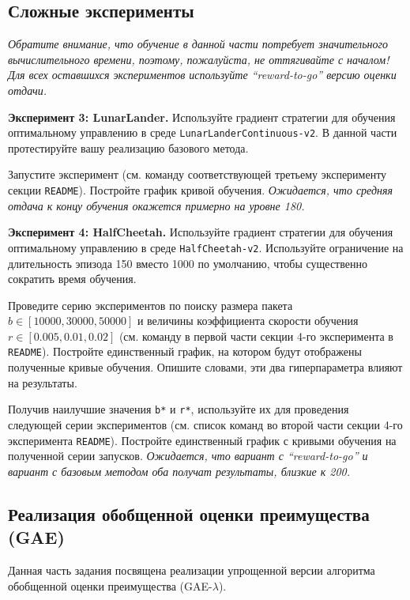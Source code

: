 \documentclass[12pt, oneside]{article}
\begin{document}
\subsection{Сложные эксперименты}

\textit{Обратите внимание, что обучение в данной части потребует значительного вычислительного времени, поэтому, пожалуйста, не оттягивайте с началом! Для всех оставшихся экспериментов используйте ``reward-to-go'' версию оценки отдачи.}

\textbf{Эксперимент 3: LunarLander.} Используйте градиент стратегии для обучения оптимальному управлению в среде \verb|LunarLanderContinuous-v2|. В данной части протестируйте вашу реализацию базового метода.

Запустите эксперимент (см. команду соответствующей  третьему эксперименту секции \verb|README|). Постройте график кривой обучения. \textit{Ожидается, что средняя отдача к концу обучения окажется примерно на уровне 180.}

\textbf{Эксперимент 4: HalfCheetah.} Используйте градиент стратегии для обучения оптимальному управлению в среде \verb|HalfCheetah-v2|. Используйте ограничение на длительность эпизода 150 вместо 1000 по умолчанию, чтобы существенно сократить время обучения.

Проведите серию экспериментов по поиску размера пакета $b \in [10000, 30000, 50000]$ и величины коэффициента скорости обучения $r \in [0.005, 0.01, 0.02]$ (см. команду в первой части секции 4-го эксперимента в \verb|README|). Постройте единственный график, на котором будут отображены полученные кривые обучения. Опишите словами, эти два гиперпараметра влияют на результаты.

Получив наилучшие значения \verb|b*| и \verb|r*|, используйте их для проведения следующей серии экспериментов (см. список команд во второй части секции 4-го эксперимента \verb|README|). Постройте единственный график с кривыми обучения на полученной серии запусков. \textit{Ожидается, что вариант с ``reward-to-go'' и вариант с базовым методом оба получат результаты, близкие к 200.}

\subsection{Реализация обобщенной оценки преимущества (GAE)}

Данная часть задания посвящена реализации упрощенной версии алгоритма обобщенной оценки преимущества (GAE-$\lambda$).
\end{document}
